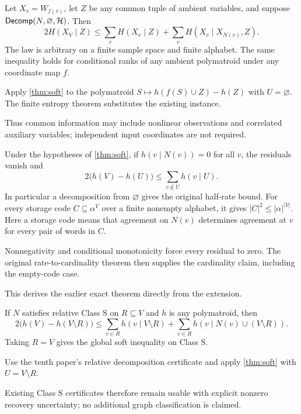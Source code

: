 \begin{corollary}\label{cor:conditional-soft}
Let $X_v=W_{f(v)}$, let $Z$ be any common tuple of ambient variables,
and suppose $\mathsf{Decomp}(N,\varnothing,\mathcal H)$. Then
\begin{equation}
2H(X_V\mid Z)\le
\sum_v H(X_v\mid Z)+\sum_v H(X_v\mid X_{N(v)},Z).
\label{eq:conditional-soft}
\end{equation}
The law is arbitrary on a finite sample space and finite alphabet.
The same inequality holds for conditional ranks of any ambient
polymatroid under any coordinate map $f$.
\end{corollary}
\begin{outline}
Apply \cref{thm:soft} to the polymatroid
$S\mapsto h(f(S)\cup Z)-h(Z)$ with $U=\varnothing$.
The finite entropy theorem substitutes the existing
 instance.
\end{outline}
Thus common information may include nonlinear observations and
correlated auxiliary variables; independent input coordinates are not
required.

\begin{corollary}\label{cor:exact}
Under the hypotheses of \cref{thm:soft}, if $h(v\mid N(v))=0$ for
all $v$, the residuals vanish and
\[
2\bigl(h(V)-h(U)\bigr)\le\sum_{v\notin U}h(v\mid U).
\]
In particular a decomposition from $\varnothing$ gives the original
half-rate bound. For every storage code $C\subseteq\alpha^V$ over a
finite nonempty alphabet, it gives $|C|^2\le |\alpha|^{|V|}$.
Here a storage code means that agreement on $N(v)$ determines agreement
at $v$ for every pair of words in $C$.
\end{corollary}
\begin{outline}
Nonnegativity and conditional monotonicity force every residual to
zero. The original rate-to-cardinality theorem then supplies the
cardinality claim, including the empty-code case.
\end{outline}
This derives the earlier exact theorem directly from the extension.

\begin{corollary}\label{cor:class-s}
If $N$ satisfies relative Class S on $R\subseteq V$ and $h$ is any
polymatroid, then
\[
2\bigl(h(V)-h(V\setminus R)\bigr)
\le \sum_{v\in R}h(v\mid V\setminus R)
 +\sum_{v\in R}h(v\mid N(v)\cup(V\setminus R)).
\]
Taking $R=V$ gives the global soft inequality on Class S.
\end{corollary}
\begin{outline}
Use the tenth paper's relative decomposition certificate and apply
\cref{thm:soft} with $U=V\setminus R$.
\end{outline}
Existing Class S certificates therefore remain usable with explicit
nonzero recovery uncertainty; no additional graph classification is
claimed.
